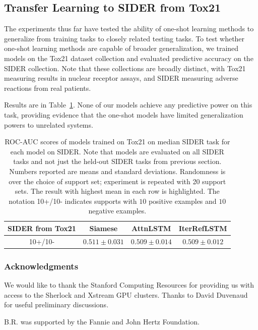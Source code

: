 \documentclass[journal=jacsat,manuscript=article]{achemso}
\begin{document}
\subsection{Transfer Learning to SIDER from Tox21}

The experiments thus far have tested the ability of one-shot learning methods to generalize from training tasks to closely related testing tasks. To test whether one-shot learning methods are capable of broader generalization, we trained models on the Tox21 dataset collection and evaluated predictive accuracy on the SIDER collection. Note that these collections are broadly distinct, with Tox21 measuring results in nuclear receptor assays, and SIDER measuring adverse reactions from real patients.

Results are in Table~\ref{tab:transfer}. None of our models achieve any predictive power on this task, providing evidence that the one-shot models have limited generalization powers to unrelated systems.

\begin{table}
    \centering
    \begin{tabular}{ |c|c|c|c| } 
    \hline
    SIDER from Tox21 & Siamese & AttnLSTM & IterRefLSTM \\ 
    \hline
    10+/10- & $0.511 \pm 0.031$ & $0.509 \pm 0.014$ & $0.509 \pm 0.012$ \\
    \hline
    \end{tabular}
    \caption{ROC-AUC scores of models trained on Tox21 on median SIDER task for each model on SIDER. Note that models are evaluated on all SIDER tasks and not just the held-out SIDER tasks from previous section. Numbers reported are means and standard deviations. Randomness is over the choice of support set; experiment is repeated with 20 support sets. The result with highest mean in each row is highlighted. The notation 10+/10- indicates supports with $10$ positive examples and $10$ negative examples.}
    \label{tab:transfer}
\end{table}


\subsubsection*{Acknowledgments}

We would like to thank the Stanford Computing Resources for providing us with access to the Sherlock and Xstream GPU clusters. Thanks to David Duvenaud for useful preliminary discussions.

B.R. was supported by the Fannie and John Hertz Foundation.
\end{document}
